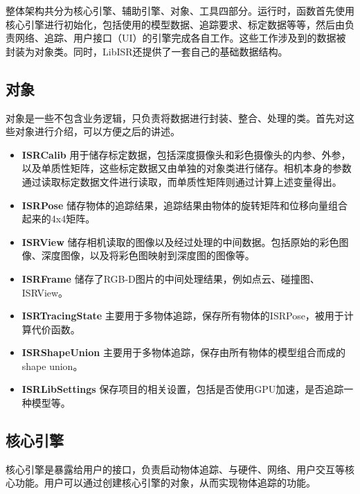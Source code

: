 整体架构共分为核心引擎、辅助引擎、对象、工具四部分。运行时，函数首先使用核心引擎进行初始化，包括使用的模型数据、追踪要求、标定数据等等，然后由负责网络、追踪、用户接口（UI）的引擎完成各自工作。这些工作涉及到的数据被封装为对象类。同时，LibISR还提供了一套自己的基础数据结构。

\subsection{对象}

对象是一些不包含业务逻辑，只负责将数据进行封装、整合、处理的类。首先对这些对象进行介绍，可以方便之后的讲述。

\begin{itemize}
    \item \textbf{ISRCalib}
用于储存标定数据，包括深度摄像头和彩色摄像头的内参、外参，以及单质性矩阵，这些标定数据又由单独的对象类进行储存。相机本身的参数通过读取标定数据文件进行读取，而单质性矩阵则通过计算上述变量得出。
    
    \item \textbf{ISRPose}
储存物体的追踪结果，追踪结果由物体的旋转矩阵和位移向量组合起来的4x4矩阵。
    
    \item \textbf{ISRView}
储存相机读取的图像以及经过处理的中间数据。包括原始的彩色图像、深度图像，以及将彩色图映射到深度图的图像等。

    \item \textbf{ISRFrame}
储存了RGB-D图片的中间处理结果，例如点云、碰撞图、ISRView。
    
    \item \textbf{ISRTracingState}
主要用于多物体追踪，保存所有物体的ISRPose，被用于计算代价函数。

    \item \textbf{ISRShapeUnion}
主要用于多物体追踪，保存由所有物体的模型组合而成的shape union。

    \item \textbf{ISRLibSettings}
保存项目的相关设置，包括是否使用GPU加速，是否追踪一种模型等。
\end{itemize}

\subsection{核心引擎}

核心引擎是暴露给用户的接口，负责启动物体追踪、与硬件、网络、用户交互等核心功能。用户可以通过创建核心引擎的对象，从而实现物体追踪的功能。


